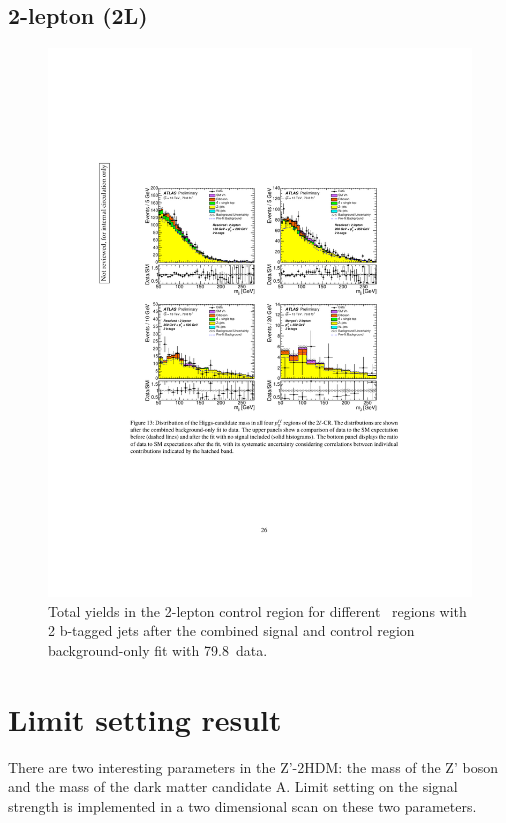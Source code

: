 \subsection{2-lepton (2L)}
\begin{figure}[H]
    \includegraphics[width=15cm, trim={4cm 9cm 4cm 6cm}, clip]{chapters/c9/figures/post-fit-2lep.pdf}
  \caption{Total yields in the 2-lepton control region for different \met~regions with \\2 b-tagged jets after the combined signal and control region background-only fit with 79.8~\ifb data.}
  \label{fig:Data_MC_CR2_ll_m_jj_2b_postfit}
\end{figure}

\section{Limit setting result}
\label{sec:limitres}

\par There are two interesting parameters in the Z'-2HDM: the mass of the Z' boson and the mass of the dark matter candidate A. 
Limit setting on the signal strength is implemented in a two dimensional scan on these two parameters.


